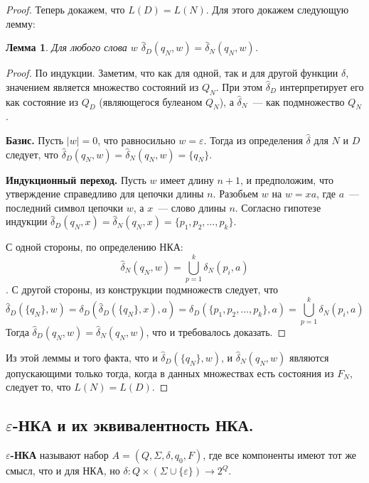 \documentclass[a4paper,12pt]{article}
\newtheorem*{lemma}{Лемма}
\begin{document}
\begin{proof}
		Теперь докажем, что \(L(D) = L(N)\). Для этого докажем следующую лемму:
		\begin{lemma}
			Для любого слова \(w\) \(\hat{\delta}_D({q_N}, w) = \hat{\delta}_N(q_N, w)\).
		\end{lemma}
		\begin{proof}
		 	По индукции. Заметим, что как для одной, так и для другой функции \(\delta\), значением является множество состояний из \(Q_N\). При этом \(\hat{\delta}_D\) интерпретирует его как состояние из \(Q_D\) (являющегося булеаном \(Q_N\)), а \(\hat{\delta}_N\)~--- как подмножество \(Q_N\).
		 	
		 	\textbf{Базис.} Пусть \(|w| = 0\), что равносильно \(w = \varepsilon\). Тогда из определения \(\hat{\delta}\) для \(N\) и \(D\) следует, что \(\hat{\delta}_D({q_N}, w) = \hat{\delta}_N(q_N, w) = \{q_N\}\).
		 	
		 	\textbf{Индукционный переход.} Пусть \(w\) имеет длину \(n + 1\), и предположим, что утверждение справедливо для цепочки длины \(n\). Разобьем \(w\) на \(w = xa\), где \(a\)~--- последний символ цепочки \(w\), а \(x\)~--- слово длины \(n\). Согласно гипотезе индукции \(\hat{\delta}_D({q_N}, x) = \hat{\delta}_N(q_N, x) = \{p_1, p_2, \ldots, p_k\}\).
		 	
		 	С одной стороны, по определению НКА:
		 	\[\hat{\delta}_N(q_N, w) = \bigcup_{p = 1}^{k} \delta_N(p_i, a)\].
		 	С другой стороны, из конструкции подмножеств следует, что
		 	\[\hat{\delta}_D(\{q_N\}, w) = \delta_D(\hat{\delta}_D(\{q_N\}, x), a) = \delta_D(\{p_1, p_2, \ldots, p_k\}, a) = \bigcup_{p = 1}^{k} \delta_N(p_i, a)\]
		 	Тогда \(\hat{\delta}_D({q_N}, w) = \hat{\delta}_N(q_N, w)\), что и требовалось доказать.
		\end{proof}
		
		Из этой леммы и того факта, что и \(\hat{\delta}_D(\{q_N\}, w)\), и \(\hat{\delta}_N(q_N, w)\) являются допускающими только тогда, когда в данных множествах есть состояния из \(F_N\), следует то, что \(L(N) = L(D)\).
	\end{proof}
	
	\subsection{\(\varepsilon\)-НКА и их эквивалентность НКА.}
	\textbf{\(\varepsilon\)-НКА} называют набор \(A = (Q, \Sigma,\delta, q_0, F)\), где все компоненты имеют тот же смысл, что и для НКА, но \(\delta : Q \times (\Sigma \cup \{\varepsilon\}) \to 2^Q\).
	
\end{document}
